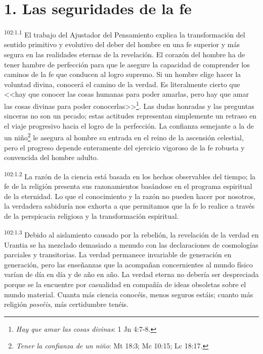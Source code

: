 \documentclass[twoside, 11pt]{book}
\begin{document}
\section*{1. Las seguridades de la fe}
\par
\textsuperscript{102:1.1} El trabajo del Ajustador del Pensamiento explica la transformación del sentido primitivo y evolutivo del deber del hombre en una fe superior y más segura en las realidades eternas de la revelación. El corazón del hombre ha de tener hambre de perfección para que le asegure la capacidad de comprender los caminos de la fe que conducen al logro supremo. Si un hombre elige hacer la voluntad divina, conocerá el camino de la verdad. Es literalmente cierto que <<hay que conocer las cosas humanas para poder amarlas, pero hay que amar las cosas divinas para poder conocerlas>>\footnote{\textit{Hay que amar las cosas divinas}: 1 Jn 4:7-8.}. Las dudas honradas y las preguntas sinceras no son un pecado; estas actitudes representan simplemente un retraso en el viaje progresivo hacia el logro de la perfección. La confianza semejante a la de un niño\footnote{\textit{Tener la confianza de un niño}: Mt 18:3; Mc 10:15; Lc 18:17.} le asegura al hombre su entrada en el reino de la ascensión celestial, pero el progreso depende enteramente del ejercicio vigoroso de la fe robusta y convencida del hombre adulto.

\par
\textsuperscript{102:1.2} La razón de la ciencia está basada en los hechos observables del tiempo; la fe de la religión presenta sus razonamientos basándose en el programa espiritual de la eternidad. Lo que el conocimiento y la razón no pueden hacer por nosotros, la verdadera sabiduría nos exhorta a que permitamos que la fe lo realice a través de la perspicacia religiosa y la transformación espiritual.

\par
\textsuperscript{102:1.3} Debido al aislamiento causado por la rebelión, la revelación de la verdad en Urantia se ha mezclado demasiado a menudo con las declaraciones de cosmologías parciales y transitorias. La verdad permanece invariable de generación en generación, pero las enseñanzas que la acompañan concernientes al mundo físico varían de día en día y de año en año. La verdad eterna no debería ser despreciada porque se la encuentre por casualidad en compañía de ideas obsoletas sobre el mundo material. Cuanta más ciencia conocéis, menos seguros estáis; cuanto más religión \textit{poseéis}, más certidumbre tenéis.
\end{document}

